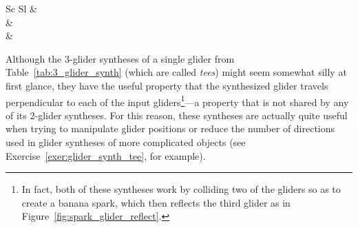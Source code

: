 \begin{table}[!htbp]
\begin{center}
\begin{tabular}{Sc Sl}
			  &  \\
			
			 &  \\
			
			  &  \\\bottomrule
		\end{tabular}
		\caption{A selection of useful $3$-glider syntheses. The $3$-glider collision that creates a glider-producing switch engine is not a true glider synthesis due to the fact that it also creates a wide assortment of other debris, but it is nonetheless noteworthy for being the only known way of generating infinite growth with just $3$ gliders.}\label{tab:3_glider_synth}
	\end{center}
\end{table}

Although the $3$-glider syntheses of a single glider from Table~\ref{tab:3_glider_synth} (which are called \emph{tees}) might seem somewhat silly at first glance, they have the useful property that the synthesized glider travels perpendicular to each of the input gliders\footnote{In fact, both of these syntheses work by colliding two of the gliders so as to create a banana spark, which then reflects the third glider as in Figure~\ref{fig:spark_glider_reflect}.}---a property that is not shared by any of its $2$-glider syntheses. For this reason, these syntheses are actually quite useful when trying to manipulate glider positions or reduce the number of directions used in glider syntheses of more complicated objects (see Exercise~\ref{exer:glider_synth_tee}, for example).


